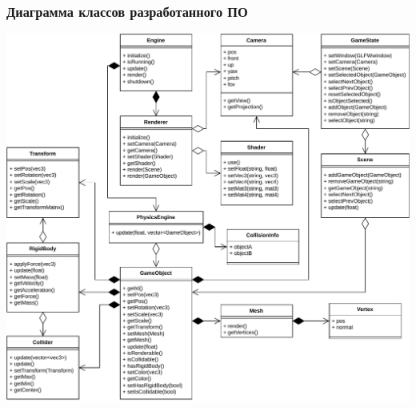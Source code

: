 \documentclass{beamer}
\begin{document}
\begin{frame}
\frametitle{Диаграмма классов разработанного ПО}
\centering
\includegraphics[scale=0.40]{diag/uml.pdf}
\end{frame}
\end{document}
